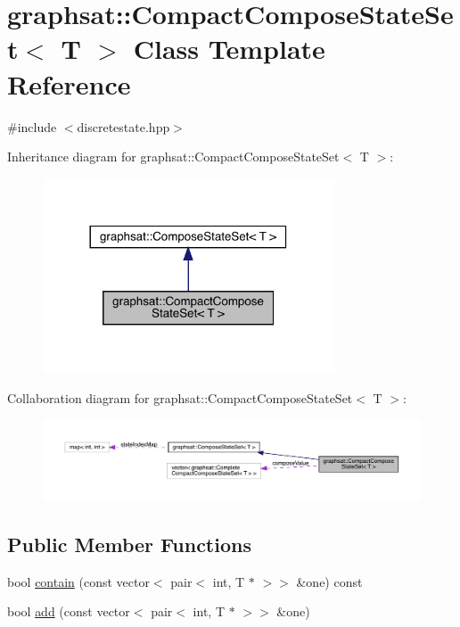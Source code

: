 \hypertarget{classgraphsat_1_1_compact_compose_state_set}{}\section{graphsat\+::Compact\+Compose\+State\+Set$<$ T $>$ Class Template Reference}
\label{classgraphsat_1_1_compact_compose_state_set}


{\ttfamily \#include $<$discretestate.\+hpp$>$}



Inheritance diagram for graphsat\+::Compact\+Compose\+State\+Set$<$ T $>$\+:\nopagebreak
\begin{figure}[H]
\begin{center}
\leavevmode
\includegraphics[width=245pt]{classgraphsat_1_1_compact_compose_state_set__inherit__graph}
\end{center}
\end{figure}


Collaboration diagram for graphsat\+::Compact\+Compose\+State\+Set$<$ T $>$\+:\nopagebreak
\begin{figure}[H]
\begin{center}
\leavevmode
\includegraphics[width=350pt]{classgraphsat_1_1_compact_compose_state_set__coll__graph}
\end{center}
\end{figure}
\subsection*{Public Member Functions}
\begin{DoxyCompactItemize}
\item 
bool \mbox{\hyperlink{classgraphsat_1_1_compact_compose_state_set_a0a42f9a9d01b52368209db0e1c5e67b7}{contain}} (const vector$<$ pair$<$ int, T $\ast$ $>$$>$ \&one) const
\item 
bool \mbox{\hyperlink{classgraphsat_1_1_compact_compose_state_set_ad728351fbf1e81740088147289ef3884}{add}} (const vector$<$ pair$<$ int, T $\ast$ $>$$>$ \&one)
\end{DoxyCompactItemize}
